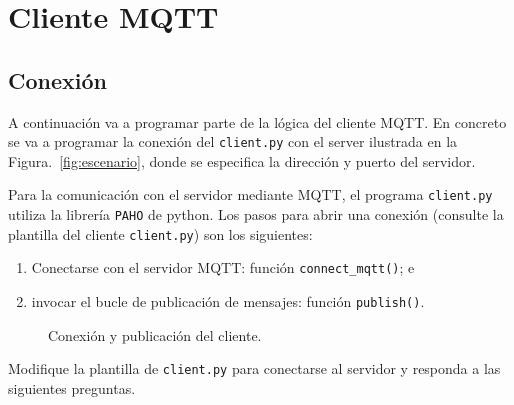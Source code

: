 \documentclass{upmassignment}
\begin{document}
\section*{Cliente MQTT}
\subsection*{Conexión}
\noindent
A continuación va a programar parte
de la lógica del cliente MQTT.
En concreto se va a programar la conexión
del \texttt{client.py} con el
server ilustrada en la
Figura.~\ref{fig:escenario},
donde se especifica la dirección y puerto
del servidor.

Para la comunicación con el servidor
mediante MQTT,
el programa \texttt{client.py} utiliza
la librería \texttt{PAHO} de python.
Los pasos para abrir una conexión
(consulte la plantilla del cliente
\texttt{client.py})
son los siguientes:
\begin{enumerate}
    \item Conectarse con el servidor
        MQTT: función
        \texttt{connect\_mqtt()}; e
    \item invocar el bucle de publicación
        de mensajes:
        función \texttt{publish()}.
\end{enumerate}

\begin{figure}[h]
    \centering
    \caption{Conexión y publicación del
    cliente.}
    \label{fig:connect-publish}
\end{figure}


Modifique la plantilla de
\texttt{client.py} para conectarse
al servidor y responda a las siguientes
preguntas.
\end{document}
